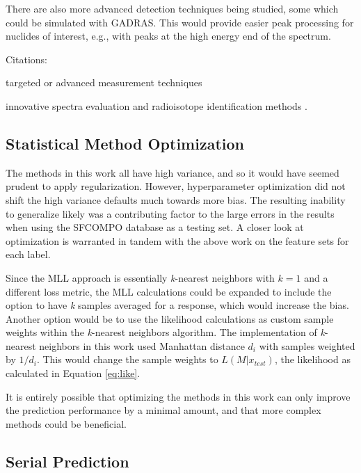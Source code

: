 There are also more advanced detection techniques being studied, some which
could be simulated with \gls{GADRAS}.  This would provide easier peak
processing for nuclides of interest, e.g., with peaks at the high energy end of
the spectrum. 

Citations:

targeted or advanced measurement techniques \cite{snf_gamma, compton_supp,
bwr_high-res_gamma, pwr_bwr_gamma}

innovative spectra evaluation and radioisotope identification methods
\cite{riid_09, rapid_riid_18, sull_gen_07, sull_valid_15, sull_auto_17,
sull_unc_17}.

\subsection{Statistical Method Optimization}

The methods in this work all have high variance, and so it would have seemed
prudent to apply regularization. However, hyperparameter optimization did not
shift the high variance defaults much towards more bias.  The resulting
inability to generalize likely was a contributing factor to the large errors in
the results when using the \gls{SFCOMPO} database as a testing set. A closer
look at optimization is warranted in tandem with the above work on the feature
sets for each label.

Since the \gls{MLL} approach is essentially \textit{k}-nearest neighbors with
$k=1$ and a different loss metric, the \gls{MLL} calculations could be expanded
to include the option to have \textit{k} samples averaged for a response, which
would increase the bias.  Another option would be to use the likelihood
calculations as custom sample weights within the \textit{k}-nearest neighbors
algorithm. The implementation of \textit{k}-nearest neighbors in this work used
Manhattan distance $d_i$ with samples weighted by $1/d_i$. This would change
the sample weights to $L(M|x_{test})$, the likelihood as calculated in Equation
\ref{eq:like}.

It is entirely possible that optimizing the methods in this work can only
improve the prediction performance by a minimal amount, and that more complex
methods could be beneficial. 

\subsection{Serial Prediction}

